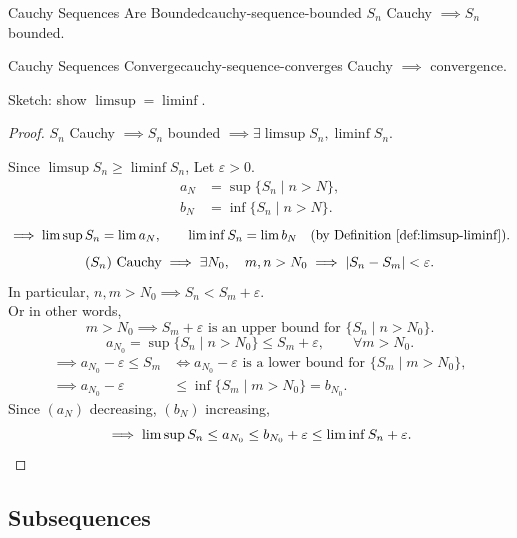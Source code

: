 \begin{theorem}{Cauchy Sequences Are Bounded}{cauchy-sequence-bounded}
  $S_n$ Cauchy $\implies S_n$ bounded.
\end{theorem}

\begin{theorem}{Cauchy Sequences Converge}{cauchy-sequence-converges}
  Cauchy $\implies$ convergence.
\end{theorem}

\noindent Sketch: show $\limsup=\liminf$.

\begin{proof}
  $S_n$ Cauchy $\implies S_n$ bounded
  $\implies\exists\limsup S_n,\liminf S_n$.

  Since $\limsup S_n\ge\liminf S_n$,
  Let $\varepsilon>0$.
  \begin{align*}
    a_N & =\sup\{S_n\mid n>N\}, \\
    b_N & =\inf\{S_n\mid n>N\}.
  \end{align*}
  \[
    \implies\limsup S_n=\lim a_N,\qquad
    \liminf S_n=\lim b_N
    \quad\text{(by Definition~\ref{def:limsup-liminf}).}
  \]
  \[
    (S_n)\text{ Cauchy}\implies\exists N_0,\quad
    m,n>N_0\implies\left\lvert S_n-S_m \right\rvert<\varepsilon.
  \]
  In particular, $n,m>N_0\implies S_n<S_m+\varepsilon$.\\
  Or in other words,
  \[
    m>N_0\implies S_m+\varepsilon\text{ is an upper bound for }
    \{S_n\mid n>N_0\}.
  \]
  \[
    a_{N_0}=\sup\{S_n\mid n>N_0\}\le S_m+\varepsilon,
    \qquad\forall m>N_0.
  \]
  \begin{align*}
    \implies a_{N_0}-\varepsilon\le S_m
     & \iff a_{N_0}-\varepsilon\text{ is a lower bound for }
    \{S_m\mid m>N_0\},                                       \\
    \implies a_{N_0}-\varepsilon
     & \le\inf\{S_m\mid m>N_0\}=b_{N_0}.
  \end{align*}
  Since $(a_N)$ decreasing, $(b_N)$ increasing,
  \[
    \implies\limsup S_n\le a_{N_0}\le b_{N_0}+\varepsilon
    \le\liminf S_n+\varepsilon.\qedhere
  \]
\end{proof}

\subsection{Subsequences}

